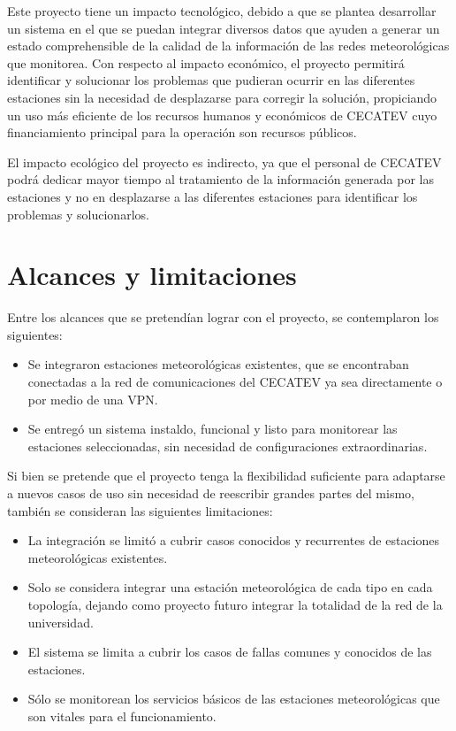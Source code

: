 Este proyecto tiene un impacto tecnológico, debido a que se plantea desarrollar un sistema en el que se puedan integrar diversos datos que ayuden a generar un estado comprehensible de la calidad de la información de las redes meteorológicas que monitorea. Con respecto al impacto económico, el proyecto permitirá identificar y solucionar los problemas que pudieran ocurrir en las diferentes estaciones sin la  necesidad de desplazarse para corregir la solución, propiciando un uso más eficiente de los recursos humanos y económicos de CECATEV cuyo financiamiento principal para la operación son recursos públicos.

El impacto ecológico del proyecto es indirecto, ya que el personal de CECATEV podrá dedicar mayor tiempo al tratamiento de la información generada por las estaciones y no en desplazarse a las diferentes estaciones para identificar los problemas y solucionarlos.

\section{Alcances y limitaciones}

\noindent Entre los alcances que se pretendían lograr con el proyecto, se contemplaron los siguientes:

\begin{itemize}

   \item Se integraron estaciones meteorológicas existentes, que se encontraban conectadas a la red de comunicaciones del CECATEV ya sea directamente o por medio de una VPN.

   \item Se entregó un sistema instaldo, funcional y listo para monitorear las estaciones seleccionadas, sin necesidad de configuraciones extraordinarias.

\end{itemize}

Si bien se pretende que el proyecto tenga la flexibilidad suficiente para adaptarse a nuevos casos de uso sin necesidad  de reescribir grandes partes del mismo, también se consideran las siguientes limitaciones:

\begin{itemize}

\item La integración se limitó a cubrir casos conocidos y recurrentes de estaciones meteorológicas existentes.
\item Solo se considera integrar una estación meteorológica de cada tipo en cada topología, dejando como proyecto futuro integrar la totalidad de la red de la universidad.
\item El sistema se limita a cubrir los casos de fallas comunes y conocidos de las estaciones.
\item Sólo se monitorean los servicios básicos de las estaciones meteorológicas que son vitales para el funcionamiento.
\end{itemize}
